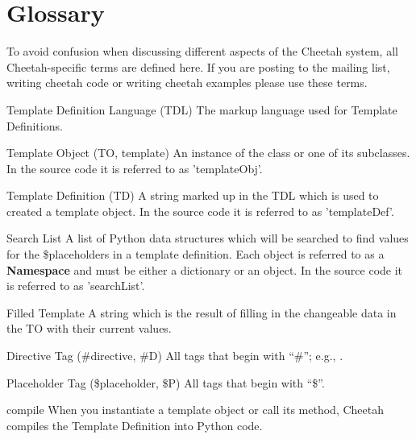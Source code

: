 \section{Glossary}
\label{glossary}

To avoid confusion when discussing different aspects of the Cheetah system, all
Cheetah-specific terms are defined here.  If you are posting to the mailing
list, writing cheetah code or writing cheetah examples please use these terms.

\begin{description}

\item{Template Definition Language (TDL)}  The markup language used for
     Template Definitions.
     
\item{Template Object (TO, template)} An instance of the class
      or one of its subclasses.  In the source
     code it is referred to as 'templateObj'.
     
\item{Template Definition (TD)} A string marked up in the TDL which is used to
     created a template object.  In the source code it is referred to as
     'templateDef'.
     
\item{Search List} A list of Python data structures which will be searched to
     find values for the \$placeholders in a template definition.  Each object
     is referred to as a {\bf Namespace} and must be either a dictionary or an
     object. In the source code it is referred to as 'searchList'.

\item{Filled Template} A string which is the result of filling in the
     changeable data in the TO with their current values.

\item{Directive Tag (\#directive, \#D)}  All tags that begin with ``\#''; e.g.,
     .  

\item{Placeholder Tag (\$placeholder, \$P)}  All tags that begin with ``\$''.
     
\item{compile} When you instantiate a template object or call its
      method, Cheetah compiles the Template Definition
     into Python code.

\end{description}



